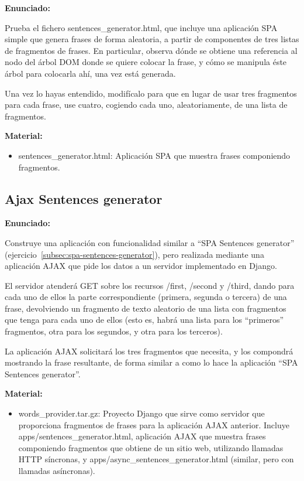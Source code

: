 \textbf{Enunciado:}

Prueba el fichero sentences\_generator.html, que incluye una aplicación SPA simple que genera frases de forma aleatoria, a partir de componentes de tres listas de fragmentos de frases. En particular, observa dónde se obtiene una referencia al nodo del árbol DOM donde se quiere colocar la frase, y cómo se manipula éste árbol para colocarla ahí, una vez está generada.

Una vez lo hayas entendido, modifícalo para que en lugar de usar tres fragmentos para cada frase, use cuatro, cogiendo cada uno, aleatoriamente, de una lista de fragmentos.

\textbf{Material:}
\begin{itemize}
\item sentences\_generator.html: Aplicación SPA que muestra frases componiendo fragmentos.
\end{itemize}

\subsection{Ajax Sentences generator}
\label{subsec:ajax-sentences-generator}

\textbf{Enunciado:}

Construye una aplicación con funcionalidad similar a ``SPA Sentences generator'' (ejercicio~\ref{subsec:spa-sentences-generator}), pero realizada mediante una aplicación AJAX que pide los datos a un servidor implementado en Django.

El servidor atenderá GET sobre los recursos /first, /second y /third, dando para cada uno de ellos la parte correspondiente (primera, segunda o tercera) de una frase, devolviendo un fragmento de texto aleatorio de una lista con fragmentos que tenga para cada uno de ellos (esto es, habrá una lista para los ``primeros'' fragmentos, otra para los segundos, y otra para los terceros).

La aplicación AJAX solicitará los tres fragmentos que necesita, y los compondrá mostrando la frase resultante, de forma similar a como lo hace la aplicación ``SPA Sentences generator''.

\textbf{Material:}

\begin{itemize}
\item words\_provider.tar.gz: Proyecto Django que sirve como servidor que proporciona fragmentos de frases para la aplicación AJAX anterior. Incluye apps/sentences\_generator.html, aplicación AJAX que muestra frases componiendo fragmentos que obtiene de un sitio web, utilizando llamadas HTTP síncronas, y apps/async\_sentences\_generator.html (similar, pero con llamadas asíncronas).
\end{itemize}

